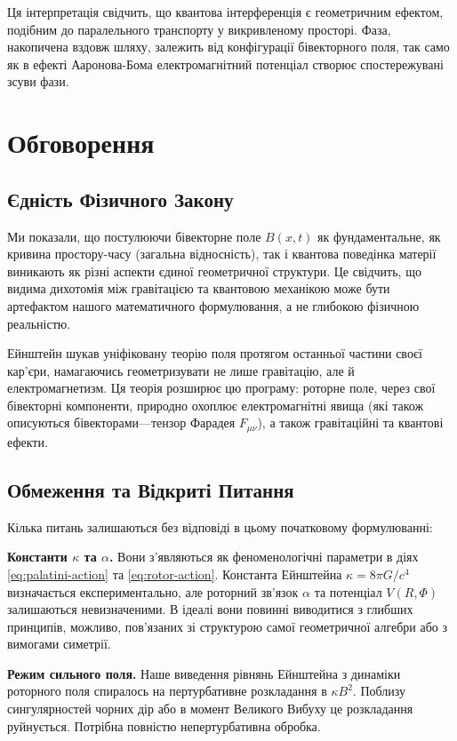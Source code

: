 \documentclass[11pt,a4paper]{article}
\numberwithin{equation}{section}
\theoremstyle{plain}
\theoremstyle{definition}
\theoremstyle{remark}
\begin{document}
Ця інтерпретація свідчить, що квантова інтерференція є геометричним ефектом, подібним до паралельного транспорту у викривленому просторі. Фаза, накопичена вздовж шляху, залежить від конфігурації бівекторного поля, так само як в ефекті Ааронова-Бома електромагнітний потенціал створює спостережувані зсуви фази.

\section{Обговорення}
\label{sec:discussion}

\subsection{Єдність Фізичного Закону}

Ми показали, що постулюючи бівекторне поле $B(x,t)$ як фундаментальне, як кривина простору-часу (загальна відносність), так і квантова поведінка матерії виникають як різні аспекти єдиної геометричної структури. Це свідчить, що видима дихотомія між гравітацією та квантовою механікою може бути артефактом нашого математичного формулювання, а не глибокою фізичною реальністю.

Ейнштейн шукав уніфіковану теорію поля протягом останньої частини своєї кар'єри, намагаючись геометризувати не лише гравітацію, але й електромагнетизм. Ця теорія розширює цю програму: роторне поле, через свої бівекторні компоненти, природно охоплює електромагнітні явища (які також описуються бівекторами---тензор Фарадея $F_{\mu\nu}$), а також гравітаційні та квантові ефекти.

\subsection{Обмеження та Відкриті Питання}

Кілька питань залишаються без відповіді в цьому початковому формулюванні:

\textbf{Константи $\kappa$ та $\alpha$.} Вони з'являються як феноменологічні параметри в діях \eqref{eq:palatini-action} та \eqref{eq:rotor-action}. Константа Ейнштейна $\kappa = 8\pi G/c^4$ визначається експериментально, але роторний зв'язок $\alpha$ та потенціал $V(R,\Phi)$ залишаються невизначеними. В ідеалі вони повинні виводитися з глибших принципів, можливо, пов'язаних зі структурою самої геометричної алгебри або з вимогами симетрії.

\textbf{Режим сильного поля.} Наше виведення рівнянь Ейнштейна з динаміки роторного поля спиралось на пертурбативне розкладання в $\kappa B^2$. Поблизу сингулярностей чорних дір або в момент Великого Вибуху це розкладання руйнується. Потрібна повністю непертурбативна обробка.
\end{document}
